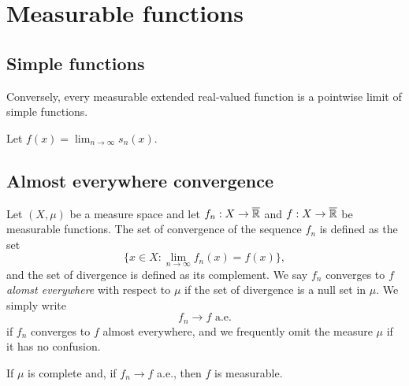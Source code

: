 \documentclass{../../large}
\begin{document}
\chapter{Measurable functions}



\section{Simple functions}
\begin{prb}

Conversely, every measurable extended real-valued function is a pointwise limit of simple functions.

\end{prb}
\begin{pf}
Let $f(x)=\lim_{n\to\infty}s_n(x)$.

\end{pf}


\section{Almost everywhere convergence}

\begin{prb}
Let $(X,\mu)$ be a measure space and let $f_n:X\to\overline{\mathbb{R}}$ and $f:X\to\overline{\mathbb{R}}$ be measurable functions.
The set of convergence of the sequence $f_n$ is defined as the set
\[\{x\in X:\lim_{n\to\infty}f_n(x)=f(x)\},\]
and the set of divergence is defined as its complement.
We say $f_n$ converges to $f$ \emph{alomst everywhere} with respect to $\mu$ if the set of divergence is a null set in $\mu$.
We simply write
\[f_n\to f\text{ a.e.}\]
if $f_n$ converges to $f$ almost everywhere, and we frequently omit the measure $\mu$ if it has no confusion.
\begin{parts}
\item If $\mu$ is complete and, if $f_n\to f$ a.e., then $f$ is measurable.
\end{parts}
\end{prb}
\end{document}
